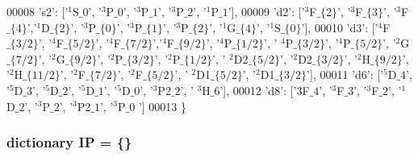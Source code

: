 \begin{DoxyCode}
00008             \textcolor{stringliteral}{'s2'}: [\textcolor{stringliteral}{'$^1$S$\_0$'}, \textcolor{stringliteral}{'$^3$P$\_0$'}, \textcolor{stringliteral}{'$^3$P$\_1$'}, \textcolor{stringliteral}{'$^3$P$\_2$'}, \textcolor{stringliteral}{'$^1$P$\_1$'}],
00009             \textcolor{stringliteral}{'d2'}: [\textcolor{stringliteral}{'$^3$F$\_\{2\}$'}, \textcolor{stringliteral}{'$^3$F$\_\{3\}$'}, \textcolor{stringliteral}{'$^3$F$\_\{4\}$'},\textcolor{stringliteral}{'$^1$D$\_\{2\}$'}, \textcolor{stringliteral}{'$^3$P$\_\{0\}$'}, \textcolor{stringliteral}{'$^3$P$\_\{1\}$'},
       \textcolor{stringliteral}{'$^3$P$\_\{2\}$'}, \textcolor{stringliteral}{'$^1$G$\_\{4\}$'}, \textcolor{stringliteral}{'$^1$S$\_\{0\}$'}], 
00010             \textcolor{stringliteral}{'d3'}: [\textcolor{stringliteral}{'$^4$F$\_\{3/2\}$'}, \textcolor{stringliteral}{'$^4$F$\_\{5/2\}$'}, \textcolor{stringliteral}{'$^4$F$\_\{7/2\}$'},\textcolor{stringliteral}{'$^4$F$\_\{9/2\}$'}, \textcolor{stringliteral}{'$^4$P$\_\{1/2\}$'}, \textcolor{stringliteral}{'
      $^4$P$\_\{3/2\}$'}, \textcolor{stringliteral}{'$^4$P$\_\{5/2\}$'}, \textcolor{stringliteral}{'$^2$G$\_\{7/2\}$'}, \textcolor{stringliteral}{'$^2$G$\_\{9/2\}$'}, \textcolor{stringliteral}{'$^2$P$\_\{3/2\}$'}, \textcolor{stringliteral}{'$^2$P$\_\{1/2\}$'}, \textcolor{stringliteral}{'
      $^2$D2$\_\{5/2\}$'}, \textcolor{stringliteral}{'$^2$D2$\_\{3/2\}$'}, \textcolor{stringliteral}{'$^2$H$\_\{9/2\}$'}, \textcolor{stringliteral}{'$^2$H$\_\{11/2\}$'}, \textcolor{stringliteral}{'$^2$F$\_\{7/2\}$'}, \textcolor{stringliteral}{'$^2$F$\_\{5/2\}$'}, \textcolor{stringliteral}{'
      $^2$D1$\_\{5/2\}$'}, \textcolor{stringliteral}{'$^2$D1$\_\{3/2\}$'}], 
00011             \textcolor{stringliteral}{'d6'}: [\textcolor{stringliteral}{'$^5$D$\_4$'}, \textcolor{stringliteral}{'$^5$D$\_3$'}, \textcolor{stringliteral}{'$^5$D$\_2$'}, \textcolor{stringliteral}{'$^5$D$\_1$'}, \textcolor{stringliteral}{'$^5$D$\_0$'}, \textcolor{stringliteral}{'$^3$P2$\_2$'}, \textcolor{stringliteral}{'
      $^3$H$\_6$'}], 
00012             \textcolor{stringliteral}{'d8'}: [\textcolor{stringliteral}{'$3$F$\_4$'}, \textcolor{stringliteral}{'$^3$F$\_3$'}, \textcolor{stringliteral}{'$^3$F$\_2$'}, \textcolor{stringliteral}{'$^1$D$\_2$'}, \textcolor{stringliteral}{'$^3$P$\_2$'}, \textcolor{stringliteral}{'$^3$P2$\_1$'}, \textcolor{stringliteral}{'$^3$P$\_0$
      '}]
00013             \}
\end{DoxyCode}
\hypertarget{namespacepyneb_1_1utils_1_1physics_a98382f08784fe7d142ec0758017c4117}{
\subsubsection[{I\-P}]{\setlength{\rightskip}{0pt plus 5cm}dictionary I\-P = \{\}}}\label{namespacepyneb_1_1utils_1_1physics_a98382f08784fe7d142ec0758017c4117}
